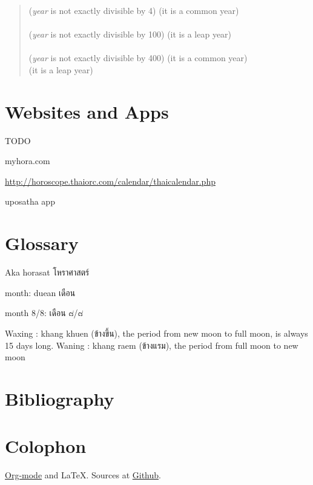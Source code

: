 \documentclass[11pt,oneside]{memoir-article}
\begin{document}
\begin{quote}
 (\emph{year} is not exactly divisible by 4)  (it is a common year)\\
\\
 (\emph{year} is not exactly divisible by 100)  (it is a leap year)\\
\\
 (\emph{year} is not exactly divisible by 400)  (it is a common year)\\
 (it is a leap year)
\autocite{wp-leap-year}
\end{quote}

\backmatter

\chapter{Websites and Apps}
\label{sec-8}

TODO

myhora.com

\url{http://horoscope.thaiorc.com/calendar/thaicalendar.php}

uposatha app

\chapter{Glossary}
\label{sec-9}

Aka horasat โหราศาสตร์

month: duean เดือน

month 8/8: เดือน ๘/๘

Waxing : khang khuen (ข้างขึ้น), the period from new moon to full moon, is always 15 days long.
Waning : khang raem (ข้างแรม), the period from full moon to new moon


\chapter{Bibliography}
\label{sec-10}
\label{bibliography}

\printbibliography

\chapter{Colophon}
\label{sec-11}

\href{http://orgmode.org/}{Org-mode} and \LaTeX. Sources at \href{https://github.com/profound-labs/calculating-the-uposatha-moondays/}{Github}.
\end{document}
